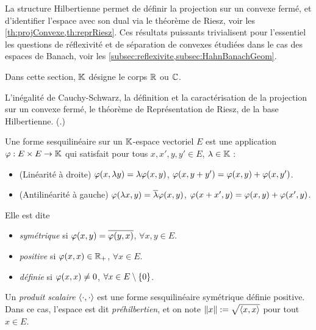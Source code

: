 
La structure Hilbertienne permet de définir la projection sur un convexe fermé, et d'identifier l'espace avec son dual via le théorème de Riesz, voir les \cref{th:projConvexe,th:reprRiesz}. Ces résultats puissants trivialisent pour l'essentiel les questions de réflexivité et de séparation de convexes étudiées dans le cas des espaces de Banach, voir les \cref{subsec:reflexivite,subsec:HahnBanachGeom}.

Dans cette section, $\mathbb{K}$ désigne le corps $\mathbb{R}$ ou $\mathbb{C}$.

\begin{retenir}
	L'inégalité de Cauchy-Schwarz, la définition et la caractérisation de la projection sur un convexe fermé, le théorème de Représentation de Riesz, de la base Hilbertienne.
	(.)
\end{retenir}


\begin{definition}
\label{def:prehilbert}
%
	Une forme sesquilinéaire sur un $\mathbb{K}$-espace vectoriel $E$ est une application $\varphi : E \times E \to \mathbb{K}$ qui satisfait pour tous $x,x',y,y' \in E$, $\lambda \in \mathbb{K}$ : 
	\begin{itemize}
		\item (Linéarité à droite) $\varphi(x,\lambda y) = \lambda \varphi(x,y)$, $\varphi(x,y+y')=\varphi(x,y)+\varphi(x,y')$. %
		\item (Antilinéarité à gauche) $\varphi(\lambda x,y) = \overline \lambda \varphi(x,y)$, $\varphi(x+x',y)=\varphi(x,y)+\varphi(x',y)$.  
	\end{itemize}
	Elle est dite 
	\begin{itemize}
		\item \emph{symétrique} si $\varphi(x,y) = \overline {\varphi(y,x)}$, $\forall x,y \in E$. 
		\item \emph{positive} si $\varphi(x,x) \in \mathbb{R}_+$, $\forall x \in E$.
		\item \emph{définie} si $\varphi(x,x) \neq 0$, $\forall x \in E\setminus \{0\}$.
	\end{itemize}
	Un \emph{produit scalaire} $\langle\cdot,\cdot\rangle$ est une forme sesquilinéaire symétrique définie positive. Dans ce cas, l'espace est dit \emph{préhilbertien}, et on note $\|x\| := \sqrt{\langle x,x\rangle}$ pour tout $x \in E$. 
\end{definition}

